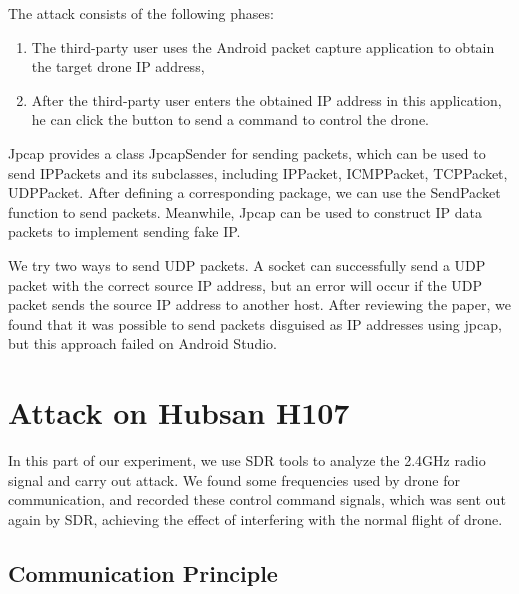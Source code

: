 \documentclass{acm_proc_article-sp}
\begin{document}
The attack consists of the following phases:

\begin{enumerate}
  \item The third-party user uses the Android packet capture application to obtain the target drone IP address,
  \item After the third-party user enters the obtained IP address in this application, he can click the button to send a command to control the drone.
\end{enumerate}


Jpcap provides a class JpcapSender for sending packets, which can be used to send IPPackets and its subclasses, including IPPacket, ICMPPacket, TCPPacket, UDPPacket\cite{jpcap}. After defining a corresponding package, we can use the SendPacket function to send packets. Meanwhile, Jpcap can be used to construct IP data packets to implement sending fake IP.

We try two ways to send UDP packets. A socket can successfully send a UDP packet with the correct source IP address, but an error will occur if the UDP packet sends the source IP address to another host. After reviewing the paper, we found that it was possible to send packets disguised as IP addresses using jpcap, but this approach failed on Android Studio.


\section{Attack on Hubsan H107}

 In this part of our experiment, we use SDR tools to analyze the 2.4GHz radio signal and carry out attack. We found some frequencies used by drone for communication, and recorded these control command signals, which was sent out again by SDR, achieving the effect of interfering with the normal flight of drone.
 

\subsection{Communication Principle}
\end{document}

